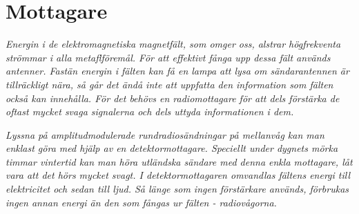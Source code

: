 \section{Mottagare}
\label{mottagare}

\emph{Energin i de elektromagnetiska magnetfält, som omger oss,
  alstrar högfrekventa strömmar i alla metaflföremål. För att
  effektivt fånga upp dessa fält används antenner.  Fastän energin i
  fälten kan få en lampa att lysa om sändarantennen är tillräckligt
  nära, så går det ändå inte att uppfatta den information som fälten
  också kan innehålla.  För det behövs en radiomottagare för att dels
  förstärka de oftast mycket svaga signalerna och dels uttyda
  informationen i dem.}

\emph{Lyssna på amplitudmodulerade rundradiosändningar på mellanvåg
  kan man enklast göra med hjälp av en detektormottagare. Speciellt
  under dygnets mörka timmar vintertid kan man höra utländska sändare
  med denna enkla mottagare, låt vara att det hörs mycket svagt. I
  detektormottagaren omvandlas fältens energi till elektricitet och
  sedan till ljud. Så länge som ingen förstärkare används, förbrukas
  ingen annan energi än den som fångas ur fälten - radiovågorna.}
